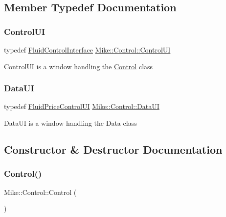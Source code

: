 \subsection{Member Typedef Documentation}
\mbox{\label{class_mike_1_1_control_aba56a17e2d16d087731d215476fff47d}} 
\subsubsection{\texorpdfstring{Control\+UI}{ControlUI}}
{\footnotesize\ttfamily typedef \hyperlink{class_fluid_control_interface}{Fluid\+Control\+Interface} \hyperlink{class_mike_1_1_control_aba56a17e2d16d087731d215476fff47d}{Mike\+::\+Control\+::\+Control\+UI}\hspace{0.3cm}{\ttfamily [private]}}

Control\+UI is a window handling the \hyperlink{class_mike_1_1_control}{Control} class \mbox{\label{class_mike_1_1_control_addbe39ef40982f0a4002b6f74091a799}} 
\subsubsection{\texorpdfstring{Data\+UI}{DataUI}}
{\footnotesize\ttfamily typedef \hyperlink{class_fluid_price_control_u_i}{Fluid\+Price\+Control\+UI} \hyperlink{class_mike_1_1_control_addbe39ef40982f0a4002b6f74091a799}{Mike\+::\+Control\+::\+Data\+UI}\hspace{0.3cm}{\ttfamily [private]}}

Data\+UI is a window handling the Data class 

\subsection{Constructor \& Destructor Documentation}
\mbox{\label{class_mike_1_1_control_ac9a2e3b56773b1eadab7297327a9fbcc}} 
\subsubsection{\texorpdfstring{Control()}{Control()}}
{\footnotesize\ttfamily Mike\+::\+Control\+::\+Control (\begin{DoxyParamCaption}{ }\end{DoxyParamCaption})}

